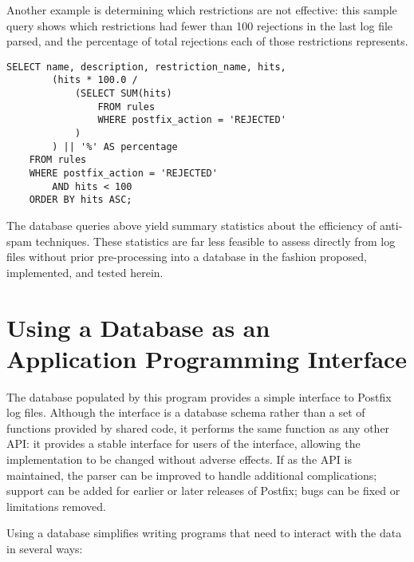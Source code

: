 Another example is determining which restrictions are not effective: this
sample query shows which restrictions had fewer than 100 rejections in the
last log file parsed, and the percentage of total rejections each of those
restrictions represents.

\begin{verbatim}
SELECT name, description, restriction_name, hits,
        (hits * 100.0 /
            (SELECT SUM(hits)
                FROM rules
                WHERE postfix_action = 'REJECTED'
            )
        ) || '%' AS percentage
    FROM rules
    WHERE postfix_action = 'REJECTED'
        AND hits < 100
    ORDER BY hits ASC;
\end{verbatim}

The database queries above yield summary statistics about the efficiency of
anti-spam techniques.  These statistics are far less feasible to assess
directly from log files without prior pre-processing into a database in the
fashion proposed, implemented, and tested herein.

\section{Using a Database as an Application Programming Interface}

\label{database as API}

The database populated by this program provides a simple interface to
Postfix log files.  Although the interface is a database schema rather than
a set of functions provided by shared code, it performs the same function
as any other \gls{API}: it provides a stable interface for users of the
interface, allowing the implementation to be changed without adverse
effects.  If as the \gls{API} is maintained, the parser can be improved to
handle additional complications; support can be added for earlier or later
releases of Postfix; bugs can be fixed or limitations removed.

Using a database simplifies writing programs that need to interact with the
data in several ways:

